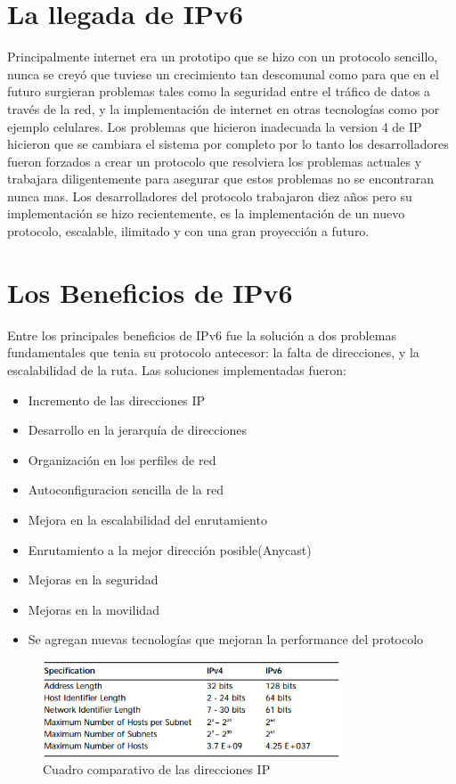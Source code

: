 \documentclass[11pt,a4paper]{article}
\begin{document}
\section{La llegada de IPv6}
Principalmente internet era un prototipo que se hizo con un protocolo sencillo, nunca se creyó que 
tuviese un crecimiento tan descomunal como para que en el futuro surgieran problemas tales como la 
seguridad entre el tráfico de datos a través de la red, y la implementación de internet en otras 
tecnologías como por ejemplo celulares. Los problemas que hicieron inadecuada la version 4 de IP 
hicieron que se cambiara el sistema por completo por lo tanto los desarrolladores fueron forzados a 
crear un protocolo que resolviera los problemas actuales y trabajara diligentemente para asegurar 
que estos problemas no se encontraran nunca mas. Los desarrolladores del protocolo trabajaron diez 
años pero su implementación se hizo recientemente, es la implementación de un nuevo protocolo, 
escalable, ilimitado y con una gran proyección a futuro.\par

\section{Los Beneficios de IPv6}
Entre los principales beneficios de IPv6 fue la solución a dos problemas fundamentales que tenia su 
protocolo antecesor: la falta de direcciones, y la escalabilidad de la ruta. Las soluciones 
implementadas fueron:
\begin{itemize}
\item Incremento de las direcciones IP
\item Desarrollo en la jerarquía de direcciones
\item Organización en los perfiles de red
\item Autoconfiguracion sencilla de la red
\item Mejora en la escalabilidad del enrutamiento
\item Enrutamiento a la mejor dirección posible(Anycast)
\item Mejoras en la seguridad
\item Mejoras en la movilidad
\item Se agregan nuevas tecnologías que mejoran la performance del protocolo

\end {itemize}

\begin{figure}[h!]
 \centering
 \includegraphics[width=0.8\textwidth]{comparativo_ip.png}
\caption[comparacion versiones IP]{Cuadro comparativo de las direcciones IP}
\end{figure} \par
\end{document}
